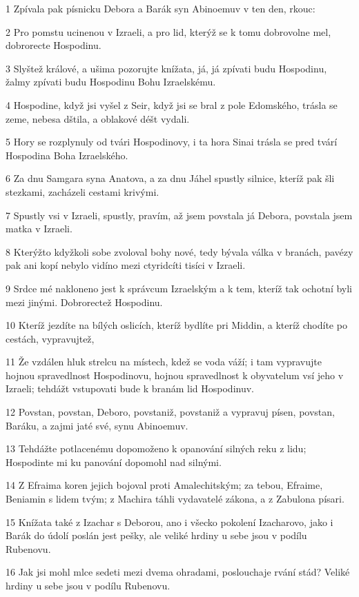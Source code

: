 \par 1 Zpívala pak písnicku Debora a Barák syn Abinoemuv v ten den, rkouc:
\par 2 Pro pomstu ucinenou v Izraeli, a pro lid, kterýž se k tomu dobrovolne mel, dobrorecte Hospodinu.
\par 3 Slyštež králové, a ušima pozorujte knížata, já, já zpívati budu Hospodinu, žalmy zpívati budu Hospodinu Bohu Izraelskému.
\par 4 Hospodine, když jsi vyšel z Seir, když jsi se bral z pole Edomského, trásla se zeme, nebesa dštila, a oblakové déšt vydali.
\par 5 Hory se rozplynuly od tvári Hospodinovy, i ta hora Sinai trásla se pred tvárí Hospodina Boha Izraelského.
\par 6 Za dnu Samgara syna Anatova, a za dnu Jáhel spustly silnice, kteríž pak šli stezkami, zacházeli cestami krivými.
\par 7 Spustly vsi v Izraeli, spustly, pravím, až jsem povstala já Debora, povstala jsem matka v Izraeli.
\par 8 Kterýžto kdyžkoli sobe zvoloval bohy nové, tedy bývala válka v branách, pavézy pak ani kopí nebylo vidíno mezi ctyridcíti tisíci v Izraeli.
\par 9 Srdce mé nakloneno jest k správcum Izraelským a k tem, kteríž tak ochotní byli mezi jinými. Dobrorectež Hospodinu.
\par 10 Kteríž jezdíte na bílých oslicích, kteríž bydlíte pri Middin, a kteríž chodíte po cestách, vypravujtež,
\par 11 Že vzdálen hluk strelcu na místech, kdež se voda váží; i tam vypravujte hojnou spravedlnost Hospodinovu, hojnou spravedlnost k obyvatelum vsí jeho v Izraeli; tehdážt vstupovati bude k branám lid Hospodinuv.
\par 12 Povstan, povstan, Deboro, povstaniž, povstaniž a vypravuj písen, povstan, Baráku, a zajmi jaté své, synu Abinoemuv.
\par 13 Tehdážte potlacenému dopomoženo k opanování silných reku z lidu; Hospodinte mi ku panování dopomohl nad silnými.
\par 14 Z Efraima koren jejich bojoval proti Amalechitským; za tebou, Efraime, Beniamin s lidem tvým; z Machira táhli vydavatelé zákona, a z Zabulona písari.
\par 15 Knížata také z Izachar s Deborou, ano i všecko pokolení Izacharovo, jako i Barák do údolí poslán jest pešky, ale veliké hrdiny u sebe jsou v podílu Rubenovu.
\par 16 Jak jsi mohl mlce sedeti mezi dvema ohradami, poslouchaje rvání stád? Veliké hrdiny u sebe jsou v podílu Rubenovu.
